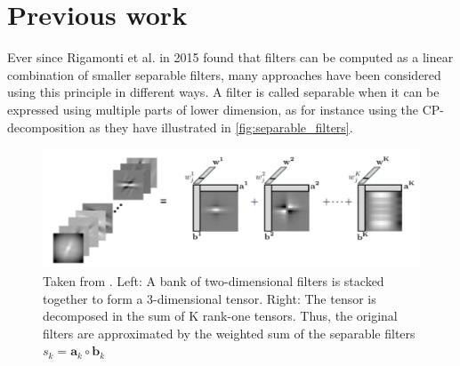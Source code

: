 \section{Previous work} \label{tex:previous_work}


Ever since Rigamonti et al. in 2015\cite{Sironi2015} found that filters can be computed as a linear combination of smaller separable filters, many approaches have been considered using this principle in different ways. A filter is called separable when it can be expressed using multiple parts of lower dimension, as for instance using the CP-decomposition as they have illustrated in \autoref{fig:separable_filters}. 

\begin{figure}[ht]
    \centering
    \includegraphics[width=.8\linewidth]{Pics/02_Previous_work/separable_filters.png}
    \caption{Taken from \cite{Sironi2015}. Left: A bank of two-dimensional filters is stacked together to form a 3-dimensional tensor. Right: The tensor is decomposed in the sum of K rank-one tensors. Thus, the original filters are approximated by the weighted sum of the separable filters $s_k = \boldsymbol{a}_k \circ \boldsymbol{b}_k$}
    \label{fig:separable_filters}
\end{figure}

